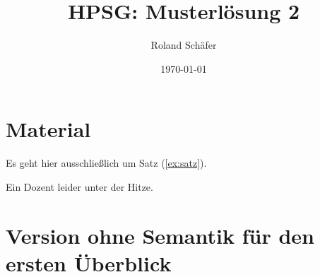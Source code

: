 \documentclass[10pt,a3paper]{article}
\author{Roland Schäfer}
\title{HPSG: Musterlösung 2}
\date{\today}
\begin{document}
\maketitle

\thispagestyle{empty}

\section{Material}

\noindent Es geht hier ausschließlich um Satz (\ref{ex:satz}).

\begin{exe}
  \ex Ein Dozent leider unter der Hitze.\label{ex:satz}
\end{exe}

\section{Version ohne Semantik für den ersten Überblick}
\end{document}
